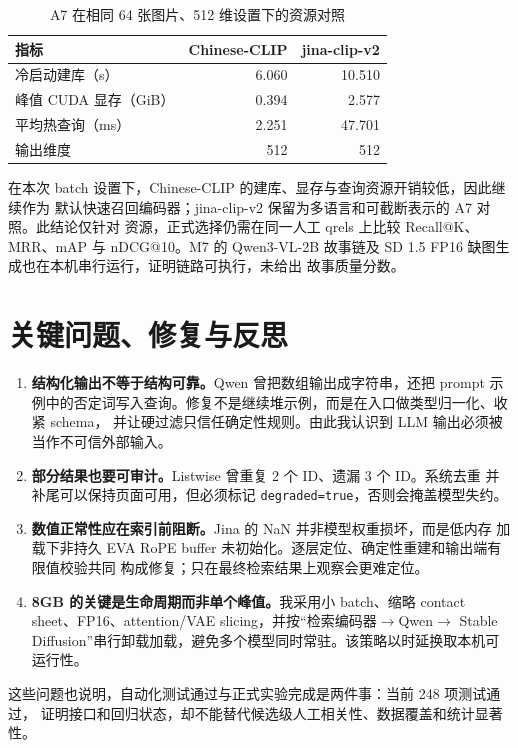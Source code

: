 \documentclass[UTF8,11pt,a4paper]{ctexart}
\begin{document}
\begin{table}[htbp]
\centering
\small
\caption{A7 在相同 64 张图片、512 维设置下的资源对照}
\begin{tabular}{lrr}
\toprule
指标 & Chinese-CLIP & jina-clip-v2 \\
\midrule
冷启动建库（s） & 6.060 & 10.510 \\
峰值 CUDA 显存（GiB） & 0.394 & 2.577 \\
平均热查询（ms） & 2.251 & 47.701 \\
输出维度 & 512 & 512 \\
\bottomrule
\end{tabular}
\end{table}

在本次 batch 设置下，Chinese-CLIP 的建库、显存与查询资源开销较低，因此继续作为
默认快速召回编码器；jina-clip-v2 保留为多语言和可截断表示的 A7 对照。此结论仅针对
资源，正式选择仍需在同一人工 qrels 上比较 Recall@K、MRR、mAP 与 nDCG@10。M7 的
Qwen3-VL-2B 故事链及 SD 1.5 FP16 缺图生成也在本机串行运行，证明链路可执行，未给出
故事质量分数。

\section{关键问题、修复与反思}

\begin{enumerate}
  \item \textbf{结构化输出不等于结构可靠。}Qwen 曾把数组输出成字符串，还把 prompt
  示例中的否定词写入查询。修复不是继续堆示例，而是在入口做类型归一化、收紧 schema，
  并让硬过滤只信任确定性规则。由此我认识到 LLM 输出必须被当作不可信外部输入。
  \item \textbf{部分结果也要可审计。}Listwise 曾重复 2 个 ID、遗漏 3 个 ID。系统去重
  并补尾可以保持页面可用，但必须标记 \texttt{degraded=true}，否则会掩盖模型失约。
  \item \textbf{数值正常性应在索引前阻断。}Jina 的 NaN 并非模型权重损坏，而是低内存
  加载下非持久 EVA RoPE buffer 未初始化。逐层定位、确定性重建和输出端有限值校验共同
  构成修复；只在最终检索结果上观察会更难定位。
  \item \textbf{8GB 的关键是生命周期而非单个峰值。}我采用小 batch、缩略 contact
  sheet、FP16、attention/VAE slicing，并按“检索编码器$\rightarrow$Qwen$\rightarrow$
  Stable Diffusion”串行卸载加载，避免多个模型同时常驻。该策略以时延换取本机可运行性。
\end{enumerate}

这些问题也说明，自动化测试通过与正式实验完成是两件事：当前 248 项测试通过，
证明接口和回归状态，却不能替代候选级人工相关性、数据覆盖和统计显著性。
\end{document}
